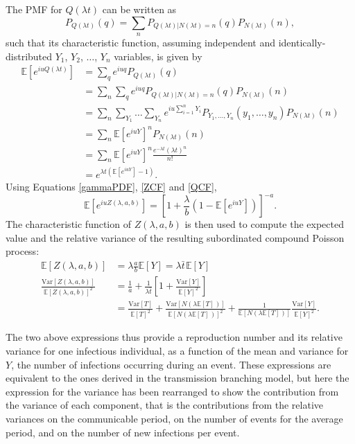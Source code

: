 \documentclass[sr]{drdc-report}
\def\tbar{\ensuremath{{}\bar{t}}}
\newcommand{\ex}[1]{\mathbb{E}\left[#1\right]}
\newcommand{\var}[1]{\mathrm{Var}\left[#1\right]}
\begin{document}
The PMF for $Q(\lambda t)$ can be written as
\begin{equation}
P_{Q(\lambda t)}(q) = \sum_n P_{Q(\lambda t)|N(\lambda t)=n}(q)P_{N(\lambda t)}(n),
\end{equation}
such that its characteristic function, assuming independent and identically-dis\-tri\-bu\-ted $Y_1$, $Y_2$, $\ldots$, $Y_n$ variables, is given by
\begin{align}
\ex{e^{iuQ(\lambda t)}} & = \sum_q e^{iuq}P_{Q(\lambda t)}(q)\nonumber\\
& = \sum_n \sum_q e^{iuq}P_{Q(\lambda t)|N(\lambda t)=n}(q)P_{N(\lambda t)}(n)\nonumber\\
& = \sum_n \sum_{Y_1}\ldots\sum_{Y_n} e^{iu\sum_{i=1}^nY_i}P_{Y_1,\ldots,Y_n}(y_1,\ldots,y_n)P_{N(\lambda t)}(n)\nonumber\\
& = \sum_n \ex{e^{iuY}}^nP_{N(\lambda t)}(n)\nonumber\\
& = \sum_n \ex{e^{iuY}}^n\frac{e^{-\lambda t}(\lambda t)^n}{n!}\nonumber\\
& = e^{\lambda t\left(\ex{e^{iuY}}-1\right)}.\label{QCF}
\end{align}
Using Equations \eqref{gammaPDF}, \eqref{ZCF} and \eqref{QCF},
\begin{equation}
\ex{e^{iuZ(\lambda,a,b)}} = \left[1+\frac{\lambda}{b}\left(1-\ex{e^{iuY}}\right)\right]^{-a}.
\end{equation}
The characteristic function of $Z(\lambda,a,b)$ is then used to compute the expected value and the relative variance of the resulting subordinated compound Poisson process:
\begin{align}
\ex{Z(\lambda,a,b)} & = \lambda\frac{a}{b}\ex{Y} = \lambda\tbar\hspace{1pt}\ex{Y}\label{exz}\\
\frac{\var{Z(\lambda,a,b)}}{\ex{Z(\lambda,a,b)}^2} & = \frac{1}{a} + \frac{1}{\lambda\tbar}\left[1+\frac{\var{Y}}{\ex{Y}^2}\right]\label{varz}\\
 & = \frac{\var{T}}{\ex{T}^2} + \frac{\var{N(\lambda\ex{T}\hspace{1pt})}}{\ex{N(\lambda\ex{T}\hspace{1pt})}^2} + \frac{1}{\ex{N(\lambda\ex{T}\hspace{1pt})}}\frac{\var{Y}}{\ex{Y}^2}.\label{varzg}
\end{align}

The two above expressions thus provide a reproduction number and its relative variance for one infectious individual, as a function of the mean and variance for $Y$, the number of infections occurring during an event.
These expressions are equivalent to the ones derived in the transmission branching model, but here the expression for the variance has been rearranged to show the contribution from the variance of each component, that is the contributions from the relative variances on the communicable period, on the number of events for the average period, and on the number of new infections per event.
\end{document}
